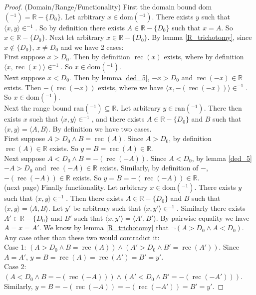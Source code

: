 \documentclass{report}
\begin{document}
\begin{proof}(Domain/Range/Functionality)
First the domain bound dom$( ^{-1})=\mathbb R-\{D_0\}$. Let arbitrary $x\in\text{dom}( ^{-1})$. There exists $y$ such that 
$\langle x,y\rangle\in ^{-1}$. So by definition there exists $A\in\mathbb R-\{D_0\}$ such that $x=A$. So $x\in\mathbb R-\{D_0\}$.
Next let arbitrary $x\in\mathbb R-\{D_0\}$. By lemma \ref{R_trichotomy}, since $x\notin\{D_0\}$, $x\neq D_0$ and we have 2 cases:\\ 
\indent First suppose $x>D_0$. Then by definition $\operatorname{rec}(x)$ exists, where by definition $\langle x,\operatorname{rec}(x)\rangle\in^{-1}$. So $x\in\text{dom}(^{-1})$.\\
\indent Next suppose $x<D_0$. Then by lemma \ref{ded_5}, $-x>D_0$ and $\operatorname{rec}(-x)\in\mathbb R$ exists. Then $-(\operatorname{rec}(-x))$ exists, where we
have $\langle x,-(\operatorname{rec}(-x))\rangle\in^{-1}$. So $x\in\text{dom}(^{-1})$.\\
\indent Next the range bound ran$(^{-1})\subseteq\mathbb R$. Let arbitrary $y\in\text{ran}(^{-1})$. There then exists $x$ such that 
$\langle x,y\rangle\in^{-1}$, and there exists $A\in\mathbb R-\{D_0\}$ and $B$ such that $\langle x,y\rangle=\langle A,B\rangle$. By definition we have 
two cases.\\
\indent First suppose $A>D_0\land B=\operatorname{rec}(A)$. Since $A>D_0$, by definition $\operatorname{rec}(A)\in\mathbb R$ exists. 
So $y=B=\operatorname{rec}(A)\in\mathbb R$.\\
\indent Next suppose $A<D_0\land B=-(\operatorname{rec}(-A))$. Since $A<D_0$, by lemma \ref{ded_5} $-A>D_0$ and 
$\operatorname{rec}(-A)\in\mathbb R$ exists. Similarly, by definition of $-$, $-(\operatorname{rec}(-A))\in\mathbb R$ exists. So
$y=B=-(\operatorname{rec}(-A))\in\mathbb R$.\\
\noindent(next page)\newpage
\indent Finally functionality. Let arbitrary $x\in\text{dom}(^{-1})$. There exists $y$ such that $\langle x,y\rangle\in^{-1}$. 
Then there exists $A\in\mathbb R-\{D_0\}$ and $B$ such that $\langle x,y\rangle=\langle A,B\rangle$.
Let $y'$ be arbitrary such that $\langle x,y'\rangle\in^{-1}$. Similarly
there exists $A'\in\mathbb R-\{D_0\}$ and $B'$ such that $\langle x,y'\rangle=\langle A',B'\rangle$. By pairwise equality we have $A=x=A'$. 
We know by lemma \ref{R_trichotomy} that $\neg(A>D_0\land A<D_0)$. Any case other than these two would contradict it:\\
\indent Case 1: $(A>D_0\land B=\operatorname{rec}(A))\land(A'>D_0\land B'=\operatorname{rec}(A'))$. Since $A=A'$, 
$y=B=\operatorname{rec}(A)=\operatorname{rec}(A')=B'=y'$.\\
\indent Case 2: $(A<D_0\land B=-(\operatorname{rec}(-A)))\land(A'<D_0\land B'=-(\operatorname{rec}(-A')))$. Similarly, 
$y=B=-(\operatorname{rec}(-A))=-(\operatorname{rec}(-A'))=B'=y'$.
\end{proof}
\newpage
\end{document}
